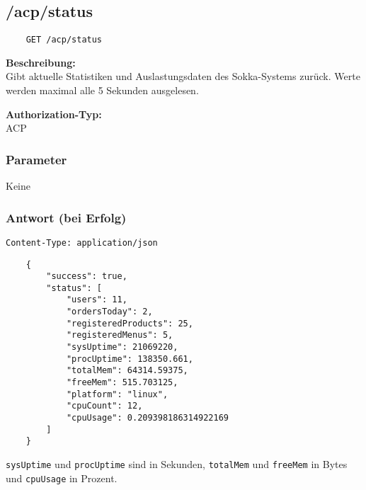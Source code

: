 \subsection{/acp/status}

\begin{lstlisting}
    GET /acp/status
\end{lstlisting}

\textbf{Beschreibung:} \\
Gibt aktuelle Statistiken und Auslastungsdaten des Sokka-Systems zurück. Werte werden maximal alle 5 Sekunden ausgelesen.

\textbf{Authorization-Typ:} \\
ACP

\subsubsection{Parameter}
Keine

\subsubsection{Antwort (bei Erfolg)}

\lstinline{Content-Type: application/json}
\begin{lstlisting}
    {
        "success": true, 
        "status": [
            "users": 11,
            "ordersToday": 2,
            "registeredProducts": 25,
            "registeredMenus": 5,
            "sysUptime": 21069220,
            "procUptime": 138350.661,
            "totalMem": 64314.59375,
            "freeMem": 515.703125,
            "platform": "linux",
            "cpuCount": 12,
            "cpuUsage": 0.209398186314922169
        ]
    }
\end{lstlisting}

\lstinline{sysUptime} und \lstinline{procUptime} sind in Sekunden,  \lstinline{totalMem} und \lstinline{freeMem} in Bytes und \lstinline{cpuUsage} in Prozent.

